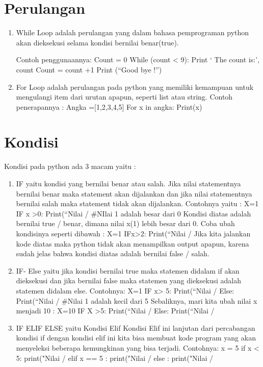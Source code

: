\section{Perulangan}
\begin{enumerate}
\item   While Loop adalah perulangan yang dalam bahasa pemprograman python akan dieksekusi selama kondisi bernilai benar(true).

Contoh penggunaannya:
Count = 0
While (count  <  9):
	Print ‘ The count is:’, count
	Count = count +1
Print (“Good bye !”)
\item   For Loop adalah perulangan pada python yang memiliki kemampuan untuk mengulangi item dari urutan apapun, seperti list atau string.
Contoh penerapannya :
Angka =[1,2,3,4,5]
For x in angka:
Print(x)
\end{enumerate}
\section{Kondisi}
Kondisi pada python ada 3 macam yaitu :
\begin{enumerate}
\item   IF yaitu kondisi yang bernilai benar atau salah. Jika nilai statementnya bernilai benar maka statement akan dijalankan dan jika nilai statementnya bernilai salah maka statement tidak akan dijalankan. Contohnya yaitu :
X=1
IF x >0:
	Print(“Nilai  /%
\#NIlai 1 adalah besar dari 0
Kondisi diatas adalah bernilai true / benar, dimana nilai x(1) lebih besar dari 0. Coba ubah kondisinya seperti dibawah :
 X=1
IFx>2:
Print(“Nilai /%
Jika kita jalankan kode diatas maka python tidak akan menampilkan output apapun, karena sudah jelas bahwa kondisi diatas adalah bernilai false / salah.

\item   IF- Else yaitu jika kondisi bernilai true maka statemen didalam if akan dieksekusi dan jika bernilai false maka statemen yang dieksekusi adalah statemen didalam else.
Contohnya:
X=1
IF x> 5:
Print(“Nilai /%
Else:
Print(“Nilai /%
\#Nilai 1 adalah kecil dari 5
Sebaliknya, mari kita ubah nilai x menjadi 10 :
X=10
IF X >5:
Print(“Nilai /%
Else:
Print(“Nilai /%
\item   IF ELIF ELSE yaitu Kondisi Elif Kondisi Elif ini lanjutan dari percabangan kondisi if dengan kondisi elif ini kita bisa membuat kode program yang akan menyeleksi beberapa kemungkinan yang bisa terjadi.
Contohnya:
x = 5
if x < 5:
	print("Nilai /%
elif x == 5 :
	print("Nilai /%
else :
	print("Nilai /%
\end{enumerate}
